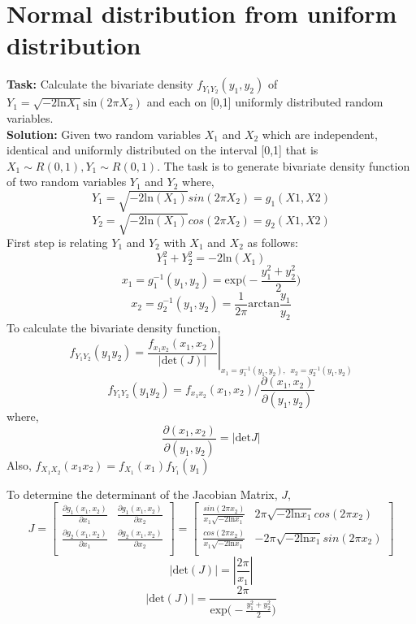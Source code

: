 
\section{Normal distribution from uniform distribution}
\noindent \textbf{Task:} Calculate the bivariate density $f_{Y_1Y_2}(y_1,y_2)$ of \\
 $Y_1 = \sqrt{-2\text{ln} X_1}\text{sin}(2\pi X_2) $ and each on [0,1] uniformly distributed random variables.\\
\noindent \textbf{Solution:} 
\noindent Given two random variables $X_1$ and $X_2$ which are independent,  identical and uniformly distributed on the interval [0,1] that is $X_1 \sim R(0,1), Y_1 \sim R(0,1)$. The task is to generate bivariate density function of two random variables $Y_1$ and $Y_2$ where,
$$Y_1 = \sqrt{-2\text{ln}(X_1)}sin(2\pi X_2) = g_1(X1,X2)$$
$$Y_2 = \sqrt{-2\text{ln}(X_1)}cos(2\pi X_2) = g_2(X1,X2)$$
\noindent First step is relating $Y_1$ and $Y_2$ with $X_1$ and $X_2$ as follows:\\
$$ Y_1^2 + Y_2^2 = -2\text{ln}(X_1) $$
$$x_1 = g_1^{-1}(y_1, y_2) = \text{exp}\Bigg(-\frac{y_1^2 + y_2^2}{2}\Bigg)$$
$$x_2 = g_2^{-1}(y_1, y_2) = \frac{1}{2 \pi}\text{arctan}{\frac{y_1}{y_2}}$$
\noindent To calculate the bivariate density function,\\
$$f_{Y_1Y_2}(y_1y_2) = \left.\frac{f_{x_1x_2}(x_1, x_2)}{|\text{det}(J)|}\right|_{x_1=g_1^{-1}(y_1, y_2),  \; \: x_2 = g_2^{-1}(y_1, y_2)}$$
\[ f_{Y_1Y_2}(y_1y_2) = f_{x_1x_2}(x_1, x_2) / \frac{\partial (x_1, x_2)}{\partial (y_1, y_2)}  \tag{3} \]
\noindent where,
$$ \frac{\partial (x_1, x_2)}{\partial (y_1, y_2)} = |\text{det} J| $$
\noindent Also, $f_{X_1X_2}(x_1x_2) = f_{X_1}(x_1) f_{Y_1}(y_1)$

\noindent To determine the determinant of the Jacobian Matrix, $J$,
\[J =
\begin{bmatrix}
\frac{\partial g_1(x_1,x_2)}{\partial x_1}  & \frac{\partial g_1(x_1,x_2)}{\partial x_2}\\
\frac{\partial g_2(x_1,x_2)}{\partial x_1}  &  \frac{\partial g_2(x_1,x_2)}{\partial x_2}\\
\end{bmatrix}
=
\begin{bmatrix}
\frac{sin(2\pi x_2)}{x_1\sqrt{-2\text{ln} x_1}}  & 2\pi\sqrt{-2\text{ln} x_1}cos(2\pi x_2)\\
\frac{cos(2\pi x_2)}{x_1\sqrt{-2\text{ln} x_1}}  &  -2\pi\sqrt{-2\text{ln} x_1}sin(2\pi x_2)\\
\end{bmatrix}
\]
$$ |\text{det}(J)| = |\frac{2\pi}{x_1}|$$
\[ |\text{det}(J)| = \frac{2 \pi}{ \text{exp}\Bigg(-\frac{y_1^2 + y_2^2}{2}\Bigg)}   \tag{4} \]

